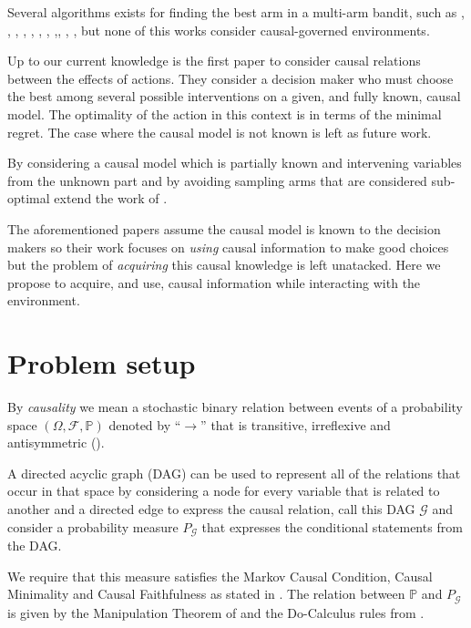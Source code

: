 \documentclass{article}
\begin{document}
Several algorithms exists for finding the best arm in a multi-arm bandit, such as \cite{bubeck2009pure}, \cite{audibert2010best}, \cite{gabillon2012best}, \cite{agarwal2014taming} , \cite{jamieson2014lil},  \cite{jamieson2014best},  \cite{ortega2014generalized}, \cite{chen2015optimal},\cite{carpentier2016tight},  \cite{russo2016simple},  \cite{kaufmann2016complexity}, but none of this works consider causal-governed environments.

Up to our current knowledge \cite{lattimoreNIPS2016} is the first paper to consider causal relations between the effects of actions. They consider a decision maker who must choose the best among several possible interventions on a given, and fully known, causal model. The optimality of the action in this context is in terms of the minimal regret. The case where the causal model is not known is left as future work.

By considering a causal model which is partially known and intervening variables from the unknown part and by avoiding sampling arms that are considered sub-optimal \cite{sen2017identifying} extend the work of \cite{lattimoreNIPS2016}.

The aforementioned papers assume the causal model is known to the decision makers so their work focuses on \textit{using} causal information to make good choices but the problem of \textit{acquiring} this causal knowledge is left unatacked. Here we propose to acquire, and use, causal information while interacting with the environment. 
\section{Problem setup}
By \textit{causality} we mean a stochastic binary relation between events of a probability space $(\Omega, \mathcal{F}, \mathbb{P})$ denoted by $“\to”$ that is transitive, irreflexive and antisymmetric (\cite{spirtes2000causation}). 

A directed acyclic graph (DAG) can be used to represent all of the relations that occur in that space by considering a node for every variable that is related to another and a directed edge to express the causal relation, call this DAG $\mathcal{G}$ and consider a probability measure $P_{\mathcal{G}}$ that expresses the conditional statements from the DAG. 

We require that this measure satisfies the Markov Causal Condition, Causal Minimality and Causal Faithfulness as stated in \cite{spirtes2000causation}. The relation between $\mathbb{P}$ and $P_{\mathcal{G}}$ is given by the Manipulation Theorem of \cite{spirtes2000causation} and the Do-Calculus rules from \cite{pearl2009causality}.
\end{document}

